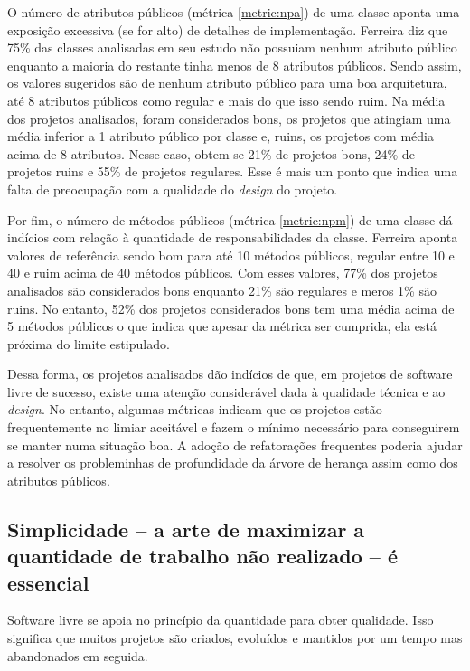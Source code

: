 O número de atributos públicos (métrica \ref{metric:npa}) de uma
classe aponta uma exposição excessiva (se for alto) de detalhes de
implementação. Ferreira diz que 75\% das classes analisadas em seu
estudo não possuiam nenhum atributo público enquanto a maioria do
restante tinha menos de 8 atributos públicos. Sendo assim, os valores
sugeridos são de nenhum atributo público para uma boa arquitetura, até
8 atributos públicos como regular e mais do que isso sendo ruim. Na
média dos projetos analisados, foram considerados bons, os projetos
que atingiam uma média inferior a 1 atributo público por classe e,
ruins, os projetos com média acima de 8 atributos. Nesse caso,
obtem-se 21\% de projetos bons, 24\% de projetos ruins e 55\% de
projetos regulares. Esse é mais um ponto que indica uma falta de
preocupação com a qualidade do \textit{design} do projeto.

Por fim, o número de métodos públicos (métrica \ref{metric:npm}) de uma
classe dá indícios com relação à quantidade de responsabilidades da
classe. Ferreira aponta valores de referência sendo bom para até 10
métodos públicos, regular entre 10 e 40 e ruim acima de 40 métodos
públicos. Com esses valores, 77\% dos projetos analisados são
considerados bons enquanto 21\% são regulares e meros 1\% são
ruins. No entanto, 52\% dos projetos considerados bons tem uma média
acima de 5 métodos públicos o que indica que apesar da métrica ser
cumprida, ela está próxima do limite estipulado.

Dessa forma, os projetos analisados dão indícios de que, em projetos
de software livre de sucesso, existe uma atenção considerável dada à
qualidade técnica e ao \textit{design}. No entanto, algumas métricas
indicam que os projetos estão frequentemente no limiar aceitável e
fazem o mínimo necessário para conseguirem se manter numa situação
boa. A adoção de refatorações frequentes poderia ajudar a resolver os
probleminhas de profundidade da árvore de herança assim como dos
atributos públicos.

\subsection[Simplicidade é essencial]{Simplicidade -- a arte de
  maximizar a quantidade de trabalho não realizado -- é essencial}

Software livre se apoia no princípio da quantidade para obter
qualidade. Isso significa que muitos projetos são criados, evoluídos e
mantidos por um tempo mas abandonados em seguida.

